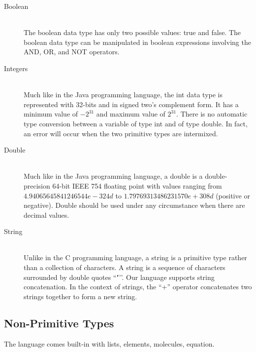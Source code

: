 \documentclass[11pt]{report}
\begin{document}
\begin{description}
\item[Boolean] \hfill \\
The boolean data type has only two possible values: true and false. The boolean data type can be manipulated in boolean expressions involving the AND, OR, and NOT operators.

\item[Integers] \hfill \\
Much like in the Java programming language, the int data type is represented with 32-bits and in signed two's complement form. It has a minimum value of $-2^{31}$ and maximum value of $2^{31}$. There is no automatic type conversion between a variable of type int and of type double. In fact, an error will occur when the two primitive types are intermixed.

\item[Double] \hfill \\
Much like in the Java programming language, a double is a double-precision 64-bit IEEE 754 floating point with values ranging from $4.94065645841246544e-324d$ to $1.79769313486231570e+308d$ (positive or negative). Double should be used under any circumstance when there are decimal values.

\item[String] \hfill \\
Unlike in the C programming language, a string is a primitive type rather than a collection of characters. A string is a sequence of characters surrounded by double quotes ``"’’. Our language supports string concatenation. In the context of strings, the ``+'' operator concatenates two strings together to form a new string. 
\end{description}

\subsection{Non-Primitive Types}
The language comes built-in with lists, elements, molecules, equation.
\end{document}
